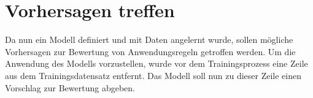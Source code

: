 \section{Vorhersagen treffen}
\label{chap:Prediction}

Da nun ein Modell definiert und mit Daten angelernt wurde, sollen mögliche Vorhersagen zur Bewertung von Anwendungsregeln getroffen werden. 
Um die Anwendung des Modells vorzustellen, wurde vor dem Trainingsprozess eine Zeile aus dem Trainingsdatensatz entfernt. 
Das Modell soll nun zu dieser Zeile einen Vorschlag zur Bewertung abgeben. 